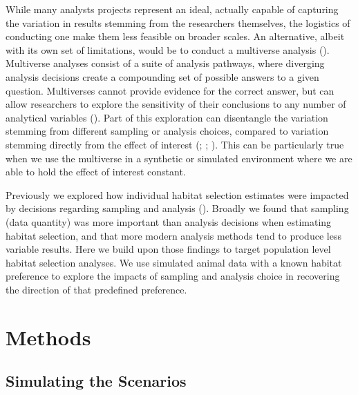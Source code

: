 \documentclass[10pt,a4paper]{article}
\begin{document}
While many analysts projects represent an ideal, actually capable of capturing the variation in results stemming from the researchers themselves, the logistics of conducting one make them less feasible on broader scales.
An alternative, albeit with its own set of limitations, would be to conduct a multiverse analysis ().
Multiverse analyses consist of a suite of analysis pathways, where diverging analysis decisions create a compounding set of possible answers to a given question.
Multiverses cannot provide evidence for the correct answer, but can allow researchers to explore the sensitivity of their conclusions to any number of analytical variables ().
Part of this exploration can disentangle the variation stemming from different sampling or analysis choices, compared to variation stemming directly from the effect of interest (; ; ).
This can be particularly true when we use the multiverse in a synthetic or simulated environment where we are able to hold the effect of interest constant.

Previously we explored how individual habitat selection estimates were impacted by decisions regarding sampling and analysis ().
Broadly we found that sampling (data quantity) was more important than analysis decisions when estimating habitat selection, and that more modern analysis methods tend to produce less variable results.
Here we build upon those findings to target population level habitat selection analyses.
We use simulated animal data with a known habitat preference to explore the impacts of sampling and analysis choice in recovering the direction of that predefined preference.

\section{Methods}\label{methods}

\subsection{Simulating the Scenarios}\label{simulating-the-scenarios}
\end{document}
